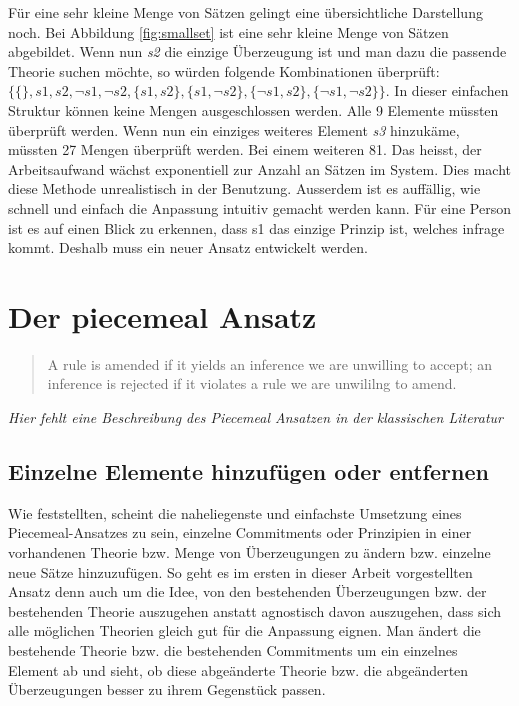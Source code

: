 \documentclass{article}
\begin{document}
Für eine sehr kleine Menge von Sätzen gelingt eine übersichtliche Darstellung noch. Bei Abbildung \ref{fig:smallset} ist eine sehr kleine Menge von Sätzen abgebildet. Wenn nun \textit{s2} die einzige Überzeugung ist und man dazu die passende Theorie suchen möchte, so würden folgende Kombinationen überprüft: $\{\{\}, s1, s2, \neg s1, \neg s2, \{s1,s2\}, \{s1,\neg s2\}, \{\neg s1, s2 \}, \{\neg s1, \neg s2 \} \}$. In dieser einfachen Struktur können keine Mengen ausgeschlossen werden. Alle 9 Elemente müssten überprüft werden. Wenn nun ein einziges weiteres Element \textit{s3} hinzukäme, müssten 27 Mengen überprüft werden. Bei einem weiteren 81. Das heisst, der Arbeitsaufwand wächst exponentiell zur Anzahl an Sätzen im System. Dies macht diese Methode unrealistisch in der Benutzung. Ausserdem ist es auffällig, wie schnell und einfach die Anpassung intuitiv gemacht werden kann. Für eine Person ist es auf einen Blick zu erkennen, dass s1 das einzige Prinzip ist, welches infrage kommt. Deshalb muss ein neuer Ansatz entwickelt werden.

\section{Der piecemeal Ansatz}
\begin{quote}
    A rule is amended if it yields an inference we are unwilling to accept; an inference is rejected if it violates a rule we are unwililng to amend. \autocite[S.~64]{goodman_fact_1983}
\end{quote}

\textit{Hier fehlt eine Beschreibung des Piecemeal Ansatzen in der klassischen Literatur}

\subsection{Einzelne Elemente hinzufügen oder entfernen}
Wie \autocite[S.25]{beisbart_making_2015} feststellten, scheint die naheliegenste und einfachste Umsetzung eines Piecemeal-Ansatzes zu sein, einzelne Commitments oder Prinzipien in einer vorhandenen Theorie bzw. Menge von Überzeugungen zu ändern bzw. einzelne neue Sätze hinzuzufügen. So geht es im ersten in dieser Arbeit vorgestellten Ansatz denn auch um die Idee, von den bestehenden Überzeugungen bzw. der bestehenden Theorie auszugehen anstatt agnostisch davon auszugehen, dass sich alle möglichen Theorien gleich gut für die Anpassung eignen. Man ändert die bestehende Theorie bzw. die bestehenden Commitments um ein einzelnes Element ab und sieht, ob diese abgeänderte Theorie bzw. die abgeänderten Überzeugungen besser zu ihrem Gegenstück passen.
\end{document}
